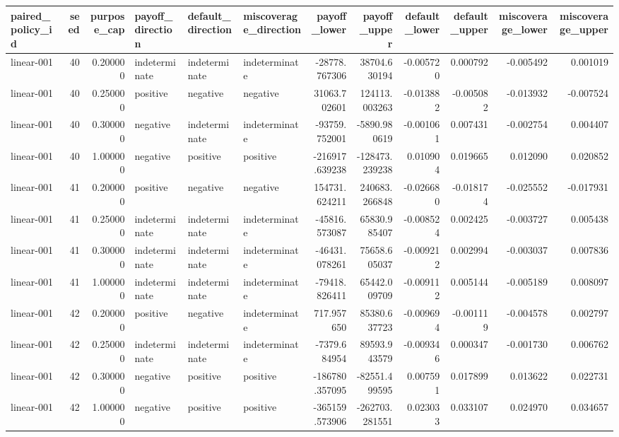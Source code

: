 \begin{tabular}{lrrlllrrrrrr}
\toprule
paired\_policy\_id & seed & purpose\_cap & payoff\_direction & default\_direction & miscoverage\_direction & payoff\_lower & payoff\_upper & default\_lower & default\_upper & miscoverage\_lower & miscoverage\_upper \\
\midrule
linear-001 & 40 & 0.200000 & indeterminate & indeterminate & indeterminate & -28778.767306 & 38704.630194 & -0.005720 & 0.000792 & -0.005492 & 0.001019 \\
linear-001 & 40 & 0.250000 & positive & negative & negative & 31063.702601 & 124113.003263 & -0.013882 & -0.005082 & -0.013932 & -0.007524 \\
linear-001 & 40 & 0.300000 & negative & indeterminate & indeterminate & -93759.752001 & -5890.980619 & -0.001061 & 0.007431 & -0.002754 & 0.004407 \\
linear-001 & 40 & 1.000000 & negative & positive & positive & -216917.639238 & -128473.239238 & 0.010904 & 0.019665 & 0.012090 & 0.020852 \\
linear-001 & 41 & 0.200000 & positive & negative & negative & 154731.624211 & 240683.266848 & -0.026680 & -0.018174 & -0.025552 & -0.017931 \\
linear-001 & 41 & 0.250000 & indeterminate & indeterminate & indeterminate & -45816.573087 & 65830.985407 & -0.008524 & 0.002425 & -0.003727 & 0.005438 \\
linear-001 & 41 & 0.300000 & indeterminate & indeterminate & indeterminate & -46431.078261 & 75658.605037 & -0.009212 & 0.002994 & -0.003037 & 0.007836 \\
linear-001 & 41 & 1.000000 & indeterminate & indeterminate & indeterminate & -79418.826411 & 65442.009709 & -0.009112 & 0.005144 & -0.005189 & 0.008097 \\
linear-001 & 42 & 0.200000 & positive & negative & indeterminate & 717.957650 & 85380.637723 & -0.009694 & -0.001119 & -0.004578 & 0.002797 \\
linear-001 & 42 & 0.250000 & indeterminate & indeterminate & indeterminate & -7379.684954 & 89593.943579 & -0.009346 & 0.000347 & -0.001730 & 0.006762 \\
linear-001 & 42 & 0.300000 & negative & positive & positive & -186780.357095 & -82551.499595 & 0.007591 & 0.017899 & 0.013622 & 0.022731 \\
linear-001 & 42 & 1.000000 & negative & positive & positive & -365159.573906 & -262703.281551 & 0.023033 & 0.033107 & 0.024970 & 0.034657 \\

\end{tabular}
